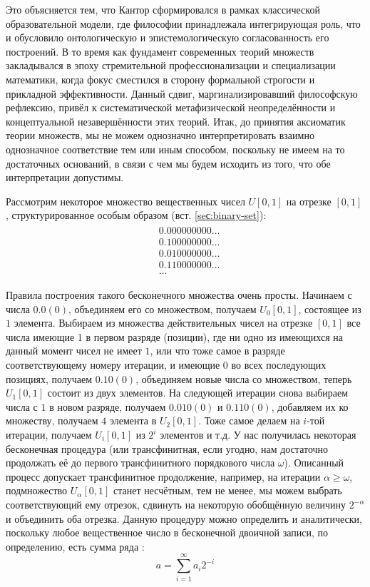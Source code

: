 \documentclass[12pt]{article}
\begin{document}
Это объясняется тем, что Кантор сформировался в рамках классической образовательной модели, где философии принадлежала интегрирующая роль, что и обусловило онтологическую и эпистемологическую согласованность его построений. В то время как фундамент современных теорий множеств закладывался в эпоху стремительной профессионализации и специализации математики, когда фокус сместился в сторону формальной строгости и прикладной эффективности. Данный сдвиг, маргинализировавший философскую рефлексию, привёл к систематической метафизической неопределённости и концептуальной незавершённости этих теорий. Итак, до принятия аксиоматик теории множеств, мы не можем однозначно интерпретировать взаимно однозначное соответствие тем или иным способом, поскольку не имеем на то достаточных оснований, в связи с чем мы будем исходить из того, что обе интерпретации допустимы. 

Рассмотрим некоторое множество вещественных чисел $U[0, 1]$ на отрезке $[0, 1]$, структурированное особым образом (вст. \ref{seс:binary-set}):
\begin{align}
\begin{split}
&0.000000000\dots\\
&0.100000000\dots\\
&0.010000000\dots\\
&0.110000000\dots\\
&\dots
\label{seс:binary-set}
\end{split}
\end{align}

Правила построения такого бесконечного множества очень просты. Начинаем с числа $0.0(0)$, объединяем его со множеством, получаем $U_0[0, 1]$, состоящее из $1$ элемента. Выбираем из множества действительных чисел на отрезке $[0, 1]$ все числа имеющие 1 в первом разряде (позиции), где ни одно из имеющихся на данный момент чисел не имеет $1$, или что тоже самое в разряде соответствующему номеру итерации, и имеющие $0$ во всех последующих позициях, получаем $0.10(0)$, объединяем новые числа со множеством, теперь $U_1[0, 1]$ состоит из двух элементов. На следующей итерации снова выбираем числа с $1$ в новом разряде, получаем $0.010(0)$ и $0.110(0)$, добавляем их ко множеству, получаем $4$ элемента в $U_2[0, 1]$. Тоже самое делаем на $i$-той итерации, получаем $U_i[0, 1]$ из $2^i$ элементов и т.д. У нас получилась некоторая бесконечная процедура (или трансфинитная, если угодно, нам достаточно продолжать её до первого трансфинитного порядкового числа $\omega$). Описанный процесс допускает трансфинитное продолжение, например, на итерации $\alpha \geq \omega$, подмножество $U_{\alpha}[0, 1]$ станет несчётным, тем не менее, мы можем выбрать соответствующий ему отрезок, сдвинуть на некоторую обобщённую величину $2^{-\alpha}$ и объединить оба отрезка. Данную процедуру можно определить и аналитически, поскольку любое вещественное число в бесконечной двоичной записи, по определению, есть сумма ряда \cite{algorithms}:
\begin{equation}
a = \sum_{i=1}^{\infty} a_i2^{-i}
\end{equation}
\end{document}
